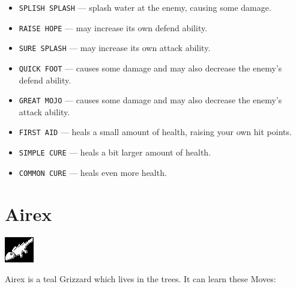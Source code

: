 \documentclass[10pt,twocolumn,openany,article]{memoir}
\begin{document}
\begin{description}
\begin{itemize}
\item  \texttt{SPLISH SPLASH}  --- splash  water at  the enemy,  causing
  some damage. 
\item \texttt{RAISE HOPE} --- may increase its own defend ability.
\item \texttt{SURE SPLASH} --- may increase its own attack ability.
\item \texttt{QUICK FOOT}  --- causes some damage and  may also decrease
  the enemy's defend ability.
\item \texttt{GREAT MOJO}  --- causes some damage and  may also decrease
  the enemy's attack ability.
\item \texttt{FIRST  AID} ---  heals a small  amount of  health, raising
  your own hit points.
\item \texttt{SIMPLE CURE} --- heals a bit larger amount of health.
\item \texttt{COMMON CURE} --- heals even more health.
\end{itemize}

\ifdefined\DEMO\else

\section{Airex}

\includegraphics[width=\columnwidth]{../Source/Banks/Bank00/Grizzard2-0.png}

Airex is a teal Grizzard which lives in the trees. It can learn these Moves:


\end{description}
\end{document}
